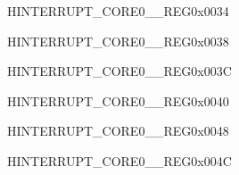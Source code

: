 \begin{register}{H}{INTERRUPT\_CORE0\_\_REG}{0x0034}\label{regdesc:INTERRUPTCORE0SLC1INTRMAPREG}






\end{register}\vspace{-3em}


\begin{register}{H}{INTERRUPT\_CORE0\_\_REG}{0x0038}\label{regdesc:INTERRUPTCORE0APBCTRLINTRMAPREG}






\end{register}\vspace{-3em}


\begin{register}{H}{INTERRUPT\_CORE0\_\_REG}{0x003C}\label{regdesc:INTERRUPTCORE0UHCI0INTRMAPREG}






\end{register}\vspace{-3em}


\begin{register}{H}{INTERRUPT\_CORE0\_\_REG}{0x0040}\label{regdesc:INTERRUPTCORE0GPIOINTERRUPTPROMAPREG}






\end{register}\vspace{-3em}










\begin{register}{H}{INTERRUPT\_CORE0\_\_REG}{0x0048}\label{regdesc:INTERRUPTCORE0SPIINTR1MAPREG}






\end{register}\vspace{-3em}


\begin{register}{H}{INTERRUPT\_CORE0\_\_REG}{0x004C}\label{regdesc:INTERRUPTCORE0SPIINTR2MAPREG}






\end{register}\vspace{-3em}


